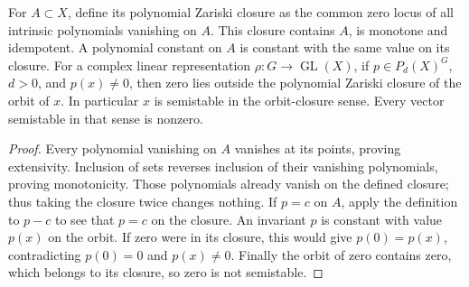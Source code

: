\begin{lemma}
\label{lem:balanced-invariant-sufficient}
\leanok
{}
For $A\subset X$, define its polynomial Zariski closure as the common
zero locus of all intrinsic polynomials vanishing on $A$. This closure
contains $A$, is monotone and idempotent. A polynomial constant on $A$
is constant with the same value on its closure.
For a complex linear representation $\rho:G\to\operatorname{GL}(X)$,
if $p\in P_d(X)^G$, $d>0$, and $p(x)\ne0$, then zero lies outside
the polynomial Zariski closure of the orbit of $x$. In particular $x$
is semistable in the orbit-closure sense. Every vector semistable in that
sense is nonzero.
\end{lemma}
\begin{proof}
Every polynomial vanishing on $A$ vanishes at its points, proving
extensivity. Inclusion of sets reverses inclusion of their vanishing
polynomials, proving monotonicity. Those polynomials already vanish on
the defined closure; thus taking the closure twice changes nothing.
If $p=c$ on $A$, apply the definition to $p-c$ to see that $p=c$
on the closure. An invariant $p$ is constant with value $p(x)$ on the
orbit. If zero were in its closure, this would give $p(0)=p(x)$,
contradicting $p(0)=0$ and $p(x)\ne0$. Finally the orbit of zero contains
zero, which belongs to its closure, so zero is not semistable.
\end{proof}


